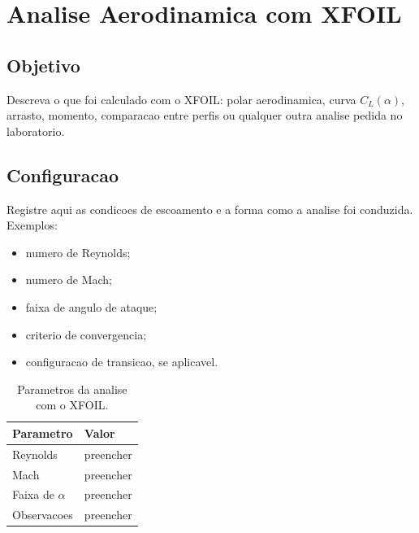 
\section{Analise Aerodinamica com XFOIL}
\label{sec:xfoil}

\subsection{Objetivo}

Descreva o que foi calculado com o XFOIL: polar aerodinamica,
curva $C_L(\alpha)$, arrasto, momento, comparacao entre perfis ou qualquer
outra analise pedida no laboratorio.

\subsection{Configuracao}

Registre aqui as condicoes de escoamento e a forma como a analise foi
conduzida. Exemplos:
\begin{itemize}
\item numero de Reynolds;
\item numero de Mach;
\item faixa de angulo de ataque;
\item criterio de convergencia;
\item configuracao de transicao, se aplicavel.
\end{itemize}

\begin{table}[H]
\centering
\caption{Parametros da analise com o XFOIL.}
\label{tab:xfoil-config}
\begin{tabular}{ll}
\toprule
Parametro & Valor \\
\midrule
Reynolds & preencher \\
Mach & preencher \\
Faixa de $\alpha$ & preencher \\
Observacoes & preencher \\
\bottomrule
\end{tabular}
\end{table}

